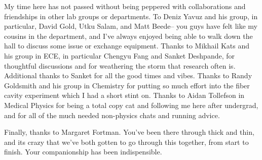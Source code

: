 My time here has not passed without being peppered with collaborations and friendships in other lab groups or departments. To Deniz Yavuz and his group, in particular, David Gold, Utku Salam, and Matt Beede-- you guys have felt like my cousins in the department, and I've always enjoyed being able to walk down the hall to discuss some issue or exchange equipment. Thanks to Mikhail Kats and his group in ECE, in particular Chengyu Fang and Sanket Deshpande, for thoughtful discussions and for weathering the storm that research often is. Additional thanks to Sanket for all the good times and vibes. Thanks to Randy Goldsmith and his group in Chemistry for putting so much effort into the fiber cavity experiment which I had a short stint on. Thanks to Aidan Tollefson in Medical Physics for being a total copy cat and following me here after undergrad, and for all of the much needed non-physics chats and running advice.

Finally, thanks to Margaret Fortman. You've been there through thick and thin, and its crazy that we've both gotten to go through this together, from start to finish. Your companionship has been indispensible.
